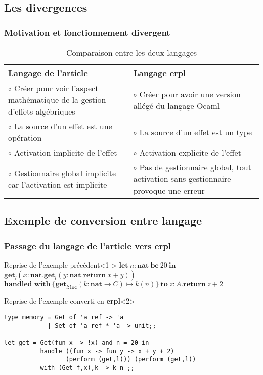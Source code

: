 \documentclass{beamer}
\begin{document}
\subsection{Les divergences}
\begin{frame}[fragile]
	\frametitle{Motivation et fonctionnement divergent}

	\begin{table}
		\begin{tabular}{ p{5cm} | p{5cm} }
		Langage de l'article & Langage \textbf{erpl} \onslide<1->\\
		\hline \hline
		$\circ$ Créer pour voir l'aspect mathématique de la gestion d'effets algébriques & 
		$\circ$ Créer pour avoir une version allégé du langage Ocaml \onslide<2-> \\ 
		$\circ$ La source d'un effet est une \alert{opération} &
		$\circ$ La source d'un effet est un \alert{type} \onslide<3->\\
		$\circ$ Activation \alert{implicite} de l'effet &
		$\circ$ Activation \alert{explicite} de l'effet \onslide<4->\\
		$\circ$ Gestionnaire global implicite car l'activation est implicite & 
		$\circ$ Pas de gestionnaire global, tout activation sans gestionnaire provoque une erreur 
		\end{tabular}
		\caption{Comparaison entre les deux langages}
	\end{table}
\end{frame}

\subsection{Exemple de conversion entre langage}
\begin{frame}[fragile]
	\frametitle{Passage du langage de l'article vers \textbf{erpl}}

	\begin{exampleblock}{Reprise de l'exemple précédent}<1->
		$\textbf{let}~n:\textbf{nat}~\textbf{be}~20~\textbf{in}$\\
		$\textbf{get}_l(x:\textbf{nat}.\textbf{get}_l(y:\textbf{nat}.\textbf{return}~x+y))$\\
		$\textbf{handled~with}~\{\textbf{get}_{l:\textbf{loc}}(k:\textbf{nat} \rightarrow \underline{C}) \mapsto k(n)\}~\textbf{to}~z:A.\textbf{return}~z+2$
	\end{exampleblock}

	\begin{exampleblock}{Reprise de l'exemple converti en \textbf{erpl}}<2>

		\begin{lstlisting}[language=caml]
type memory = Get of 'a ref -> 'a 
            | Set of 'a ref * 'a -> unit;;

let get = Get(fun x -> !x) and n = 20 in
          handle ((fun x -> fun y -> x + y + 2) 
                 (perform (get,l))) (perform (get,l)) 
          with (Get f,x),k -> k n ;;
		\end{lstlisting}
	\end{exampleblock}
\end{frame}
\end{document}

